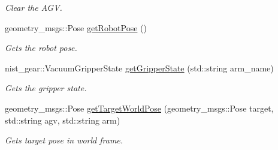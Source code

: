 \begin{DoxyCompactItemize}
\begin{DoxyCompactList}\small\item\em Clear the A\+GV. \end{DoxyCompactList}\item 
geometry\+\_\+msgs\+::\+Pose \hyperlink{classGantryControl_aefa12231efd7960bc201638f832d9478}{get\+Robot\+Pose} ()
\begin{DoxyCompactList}\small\item\em Gets the robot pose. \end{DoxyCompactList}\item 
nist\+\_\+gear\+::\+Vacuum\+Gripper\+State \hyperlink{classGantryControl_a986691834604135cf47b1c070f8d915e}{get\+Gripper\+State} (std\+::string arm\+\_\+name)
\begin{DoxyCompactList}\small\item\em Gets the gripper state. \end{DoxyCompactList}\item 
geometry\+\_\+msgs\+::\+Pose \hyperlink{classGantryControl_ae92c2fdeba302399425c1abafc76f973}{get\+Target\+World\+Pose} (geometry\+\_\+msgs\+::\+Pose target, std\+::string agv, std\+::string arm)
\begin{DoxyCompactList}\small\item\em Gets target pose in world frame. \end{DoxyCompactList}\end{DoxyCompactItemize}
